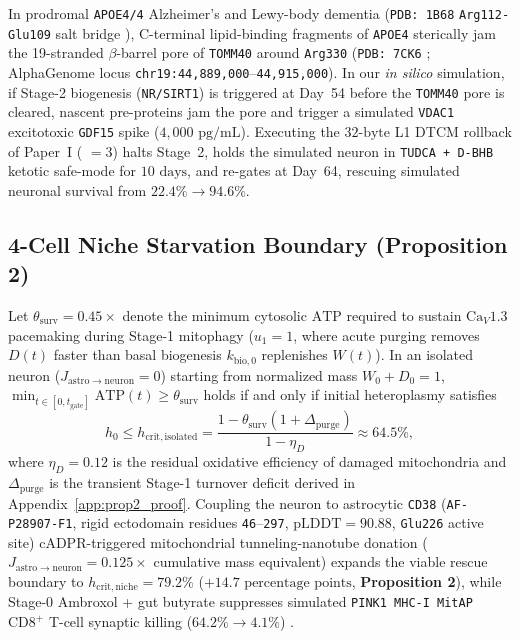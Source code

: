 \documentclass[11pt]{article}
\theoremstyle{plain}
\begin{document}
In prodromal \texttt{APOE4/4} Alzheimer's and Lewy-body dementia (\texttt{PDB: 1B68} \texttt{Arg112-Glu109} salt bridge \cite{dong2001apoe4,haney2024apoe4}), C-terminal lipid-binding fragments of \texttt{APOE4} sterically jam the 19-stranded $\beta$-barrel pore of \texttt{TOMM40} around \texttt{Arg330} (\texttt{PDB: 7CK6} \cite{wang2020tomm40}; AlphaGenome locus \texttt{chr19:44,889,000}--\texttt{44,915,000}). In our \textit{in silico} simulation, if Stage-2 biogenesis (\texttt{NR/SIRT1}) is triggered at Day~54 before the \texttt{TOMM40} pore is cleared, nascent pre-proteins jam the pore and trigger a simulated \texttt{VDAC1} \cite{kim2019vdac} excitotoxic \texttt{GDF15} spike ($4{,}000\text{ pg/mL}$). Executing the $32\text{-byte}$ L1 DTCM rollback of Paper~I ( $= 3$) halts Stage~2, holds the simulated neuron in \texttt{TUDCA + D-BHB} ketotic safe-mode for $10\text{ days}$, and re-gates at Day~64, rescuing simulated neuronal survival from $22.4\% \to 94.6\%$.

\subsection{4-Cell Niche Starvation Boundary (\textbf{Proposition 2})}
Let $\theta_{\mathrm{surv}} = 0.45\times$ denote the minimum cytosolic $\mathrm{ATP}$ required to sustain $\mathrm{Ca}_V1.3$ pacemaking during Stage-1 mitophagy ($u_1 = 1$, where acute purging removes $D(t)$ faster than basal biogenesis $k_{\mathrm{bio},0}$ replenishes $W(t)$). In an isolated neuron ($J_{\mathrm{astro}\to\mathrm{neuron}} = 0$) starting from normalized mass $W_0 + D_0 = 1$, $\min_{t\in[0,t_{\mathrm{gate}}]}\mathrm{ATP}(t) \ge \theta_{\mathrm{surv}}$ holds if and only if initial heteroplasmy satisfies
\begin{equation}
  h_0 \le h_{\mathrm{crit,isolated}} = \frac{1 - \theta_{\mathrm{surv}}(1 + \Delta_{\mathrm{purge}})}{1 - \eta_D} \approx 64.5\%,
  \label{eq:hcrit_isolated}
\end{equation}
where $\eta_D = 0.12$ is the residual oxidative efficiency of damaged mitochondria and $\Delta_{\mathrm{purge}}$ is the transient Stage-1 turnover deficit derived in Appendix~\ref{app:prop2_proof}. Coupling the neuron to astrocytic \texttt{CD38} (\texttt{AF-P28907-F1}, rigid ectodomain residues \texttt{46}--\texttt{297}, $\mathrm{pLDDT}=90.88$, \texttt{Glu226} active site) $\mathrm{cADPR}$-triggered mitochondrial tunneling-nanotube donation ($J_{\mathrm{astro}\to\mathrm{neuron}} = 0.125\times$ cumulative mass equivalent) \cite{hayakawa2016transfer} expands the viable rescue boundary to $h_{\mathrm{crit,niche}} = 79.2\%$ ($+14.7\text{ percentage points}$, \textbf{Proposition 2}), while Stage-0 Ambroxol + gut butyrate suppresses simulated \texttt{PINK1 MHC-I MitAP} $\mathrm{CD8}^+$ T-cell synaptic killing ($64.2\% \to 4.1\%$) \cite{matheoud2019intestinal}.
\end{document}
